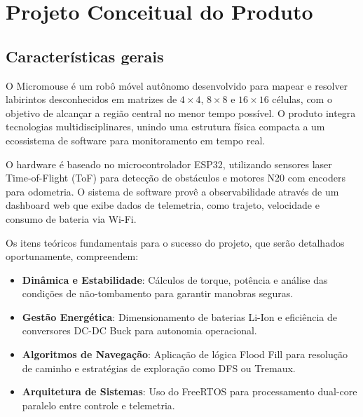 \chapter{Projeto Conceitual do Produto}

\label{projeto}

\section{Características gerais}



O Micromouse é um robô móvel autônomo desenvolvido para mapear e resolver labirintos desconhecidos em matrizes de $4\times4$, $8\times8$ e $16\times16$ células, com o objetivo de alcançar a região central no menor tempo possível. O produto integra tecnologias multidisciplinares, unindo uma estrutura física compacta a um ecossistema de software para monitoramento em tempo real.

O hardware é baseado no microcontrolador ESP32, utilizando sensores laser Time-of-Flight (ToF) para detecção de obstáculos e motores N20 com encoders para odometria. O sistema de software provê a observabilidade através de um dashboard web que exibe dados de telemetria, como trajeto, velocidade e consumo de bateria via Wi-Fi.

Os itens teóricos fundamentais para o sucesso do projeto, que serão detalhados oportunamente, compreendem:

\begin{itemize}
    \item \textbf{Dinâmica e Estabilidade}: Cálculos de torque, potência e análise das condições de não-tombamento para garantir manobras seguras.
    \item \textbf{Gestão Energética}: Dimensionamento de baterias Li-Ion e eficiência de conversores DC-DC Buck para autonomia operacional.
    \item \textbf{Algoritmos de Navegação}: Aplicação de lógica Flood Fill para resolução de caminho e estratégias de exploração como DFS ou Tremaux.
    \item \textbf{Arquitetura de Sistemas}: Uso do FreeRTOS para processamento dual-core paralelo entre controle e telemetria.
\end{itemize}

